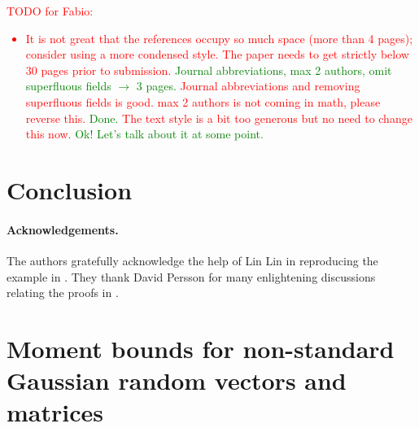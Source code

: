 \documentclass[12pt]{article}
\begin{document}
\textcolor{red}{TODO for Fabio:
\begin{itemize}
 \item It is not great that the references occupy so much space (more than 4 pages); consider using a more condensed style. The paper needs to get strictly below 30 pages prior to submission. \textcolor{green}{Journal abbreviations, max 2 authors, omit superfluous fields $\to$ 3 pages.}
 Journal abbreviations and removing superfluous fields is good. max 2 authors is not coming in math, please reverse this. \textcolor{green}{Done.} The text style is a bit too generous but no need to change this now. \textcolor{green}{Ok! Let's talk about it at some point.}
\end{itemize}
}
\color{blue}



%




\section{Conclusion}
\label{sec:conclusion}


\paragraph{Acknowledgements.} The authors gratefully acknowledge the help of Lin Lin in reproducing the example in . They thank David Persson for many enlightening discussions relating the proofs in .

\printbibliography

\appendix

\section{Moment bounds for non-standard Gaussian random vectors and matrices}
\end{document}
